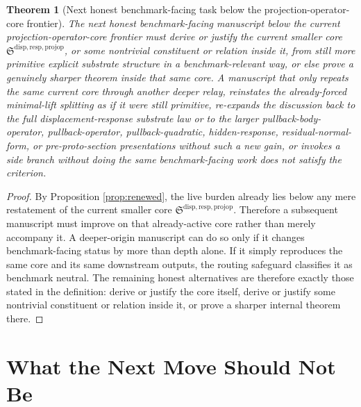\documentclass[11pt]{article}
\newcommand{\ProjectionOperatorCore}{\mathfrak S^{\mathrm{disp,resp,projop}}}
\newtheorem{theorem}{Theorem}
\begin{document}
\begin{theorem}[Next honest benchmark-facing task below the projection-operator-core frontier]
The next honest benchmark-facing manuscript below the current projection-operator-core frontier must derive or justify the current smaller core \(\ProjectionOperatorCore\), or some nontrivial constituent or relation inside it, from still more primitive explicit substrate structure in a benchmark-relevant way, or else prove a genuinely sharper theorem inside that same core. A manuscript that only repeats the same current core through another deeper relay, reinstates the already-forced minimal-lift splitting as if it were still primitive, re-expands the discussion back to the full displacement-response substrate law or to the larger pullback-body-operator, pullback-operator, pullback-quadratic, hidden-response, residual-normal-form, or pre-proto-section presentations without such a new gain, or invokes a side branch without doing the same benchmark-facing work does not satisfy the criterion.
\end{theorem}

\begin{proof}
By Proposition \ref{prop:renewed}, the live burden already lies below any mere restatement of the current smaller core \(\ProjectionOperatorCore\). Therefore a subsequent manuscript must improve on that already-active core rather than merely accompany it. A deeper-origin manuscript can do so only if it changes benchmark-facing status by more than depth alone. If it simply reproduces the same core and its same downstream outputs, the routing safeguard classifies it as benchmark neutral. The remaining honest alternatives are therefore exactly those stated in the definition: derive or justify the core itself, derive or justify some nontrivial constituent or relation inside it, or prove a sharper internal theorem there.
\end{proof}

\section{What the Next Move Should Not Be}
\end{document}
